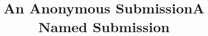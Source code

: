 \documentclass{article}
\begin{document}
\ifanonymous
\title{An Anonymous Submission} %
\else
\title{A Named Submission} %
\fi
\maketitle





\drafttrue


\appendix

\end{document}
